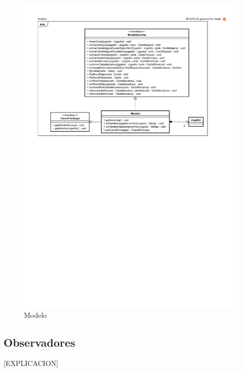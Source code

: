 \begin{figure}[H]
	\centering
	\includegraphics[scale=0.8]{includes/class_Modelo}
	\caption{Modelo}
	\label{class_Modelo}
\end{figure}

\subsection{Observadores}

[EXPLICACION]

